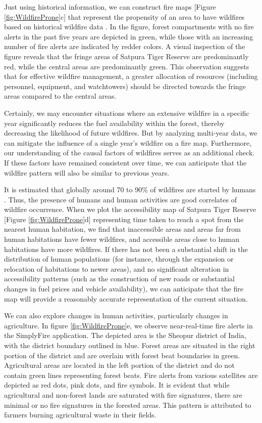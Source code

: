 \documentclass[
  12 pt,
]{Nemilov}
\begin{document}
Just using historical information, we can construct fire maps {[}Figure \ref{fig:WildfireProne}c{]} that represent the propensity of an area to have wildfires based on historical wildfire data \citep{ankur2018generation}. In the figure, forest compartments with no fire alerts in the past five years are depicted in green, while those with an increasing number of fire alerts are indicated by redder colors. A visual inspection of the figure reveals that the fringe areas of Satpura Tiger Reserve are predominantly red, while the central areas are predominantly green. This observation suggests that for effective wildfire management, a greater allocation of resources (including personnel, equipment, and watchtowers) should be directed towards the fringe areas compared to the central areas.

Certainly, we may encounter situations where an extensive wildfire in a specific year significantly reduces the fuel availability within the forest, thereby decreasing the likelihood of future wildfires. But by analyzing multi-year data, we can mitigate the influence of a single year's wildfire on a fire map. Furthermore, our understanding of the causal factors of wildfires serves as an additional check. If these factors have remained consistent over time, we can anticipate that the wildfire pattern will also be similar to previous years.

It is estimated that globally around 70 to 90\% of wildfires are started by humans \citep{robinne2021impacts}. Thus, the presence of humans and human activities are good correlates of wildfire occurrence. When we plot the accessibility map of Satpura Tiger Reserve {[}Figure \ref{fig:WildfireProne}d{]} representing time taken to reach a spot from the nearest human habitation, we find that inaccessible areas and areas far from human habitations have fewer wildfires, and accessible areas close to human habitations have more wildfires. If there has not been a substantial shift in the distribution of human populations (for instance, through the expansion or relocation of habitations to newer areas), and no significant alteration in accessibility patterns (such as the construction of new roads or substantial changes in fuel prices and vehicle availability), we can anticipate that the fire map will provide a reasonably accurate representation of the current situation.

We can also explore changes in human activities, particularly changes in agriculture. In figure \ref{fig:WildfireProne}e, we observe near-real-time fire alerts in the SimplyFire application. The depicted area is the Sheopur district of India, with the district boundary outlined in blue. Forest areas are situated in the right portion of the district and are overlain with forest beat boundaries in green. Agricultural areas are located in the left portion of the district and do not contain green lines representing forest beats. Fire alerts from various satellites are depicted as red dots, pink dots, and fire symbols. It is evident that while agricultural and non-forest lands are saturated with fire signatures, there are minimal or no fire signatures in the forested areas. This pattern is attributed to farmers burning agricultural waste in their fields.
\end{document}
